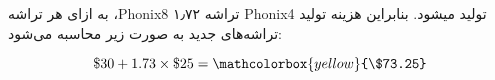 \begin{enumerate}
\begin{qsolve}
	به ازای هر تراشه ،Phonix8 ۱٫۷۲ تراشه Phonix4 تولید میشود. بنابراین هزینه تولید تراشه‌های جدید به صورت زیر محاسبه می‌شود:
	
	\begin{equation}
		\$30+1.73\times\$25=\mathcolorbox{yellow}{\$73.25}
	\end{equation}
	\end{qsolve}
	
	
	
	
	
	
	
\end{enumerate}